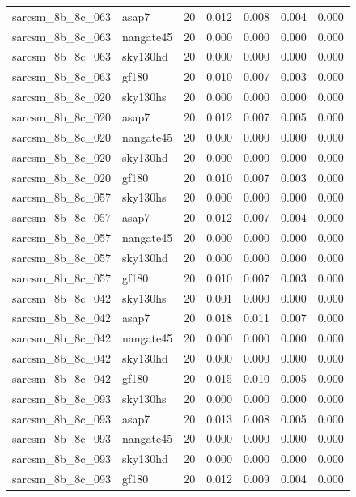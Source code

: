 \begin{tabular}{llrrrrr}
sarcsm\_8b\_8c\_063 & asap7 & 20 & 0.012 & 0.008 & 0.004 & 0.000 \\
sarcsm\_8b\_8c\_063 & nangate45 & 20 & 0.000 & 0.000 & 0.000 & 0.000 \\
sarcsm\_8b\_8c\_063 & sky130hd & 20 & 0.000 & 0.000 & 0.000 & 0.000 \\
sarcsm\_8b\_8c\_063 & gf180 & 20 & 0.010 & 0.007 & 0.003 & 0.000 \\
sarcsm\_8b\_8c\_020 & sky130hs & 20 & 0.000 & 0.000 & 0.000 & 0.000 \\
sarcsm\_8b\_8c\_020 & asap7 & 20 & 0.012 & 0.007 & 0.005 & 0.000 \\
sarcsm\_8b\_8c\_020 & nangate45 & 20 & 0.000 & 0.000 & 0.000 & 0.000 \\
sarcsm\_8b\_8c\_020 & sky130hd & 20 & 0.000 & 0.000 & 0.000 & 0.000 \\
sarcsm\_8b\_8c\_020 & gf180 & 20 & 0.010 & 0.007 & 0.003 & 0.000 \\
sarcsm\_8b\_8c\_057 & sky130hs & 20 & 0.000 & 0.000 & 0.000 & 0.000 \\
sarcsm\_8b\_8c\_057 & asap7 & 20 & 0.012 & 0.007 & 0.004 & 0.000 \\
sarcsm\_8b\_8c\_057 & nangate45 & 20 & 0.000 & 0.000 & 0.000 & 0.000 \\
sarcsm\_8b\_8c\_057 & sky130hd & 20 & 0.000 & 0.000 & 0.000 & 0.000 \\
sarcsm\_8b\_8c\_057 & gf180 & 20 & 0.010 & 0.007 & 0.003 & 0.000 \\
sarcsm\_8b\_8c\_042 & sky130hs & 20 & 0.001 & 0.000 & 0.000 & 0.000 \\
sarcsm\_8b\_8c\_042 & asap7 & 20 & 0.018 & 0.011 & 0.007 & 0.000 \\
sarcsm\_8b\_8c\_042 & nangate45 & 20 & 0.000 & 0.000 & 0.000 & 0.000 \\
sarcsm\_8b\_8c\_042 & sky130hd & 20 & 0.000 & 0.000 & 0.000 & 0.000 \\
sarcsm\_8b\_8c\_042 & gf180 & 20 & 0.015 & 0.010 & 0.005 & 0.000 \\
sarcsm\_8b\_8c\_093 & sky130hs & 20 & 0.000 & 0.000 & 0.000 & 0.000 \\
sarcsm\_8b\_8c\_093 & asap7 & 20 & 0.013 & 0.008 & 0.005 & 0.000 \\
sarcsm\_8b\_8c\_093 & nangate45 & 20 & 0.000 & 0.000 & 0.000 & 0.000 \\
sarcsm\_8b\_8c\_093 & sky130hd & 20 & 0.000 & 0.000 & 0.000 & 0.000 \\
sarcsm\_8b\_8c\_093 & gf180 & 20 & 0.012 & 0.009 & 0.004 & 0.000 \\

\end{tabular}
